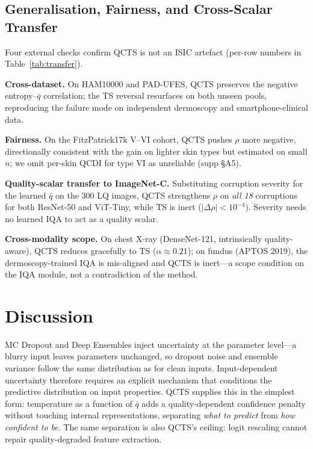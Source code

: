 \documentclass{bmvc2k}
\begin{document}


\subsection{Generalisation, Fairness, and Cross-Scalar Transfer}
\label{sec:generalisation}

Four external checks confirm QCTS is not an ISIC artefact (per-row numbers in Table~\ref{tab:transfer}).

\textbf{Cross-dataset.}
On HAM10000 and PAD-UFES, QCTS preserves the negative entropy--$\bar q$ correlation; the TS reversal resurfaces on both unseen pools, reproducing the failure mode on independent dermoscopy and smartphone-clinical data.

\textbf{Fairness.}
On the FitzPatrick17k V--VI cohort, QCTS pushes $\rho$ more negative, directionally consistent with the gain on lighter skin types but estimated on small $n$; we omit per-skin QCDI for type VI as unreliable (supp \S A5).

\textbf{Quality-scalar transfer to ImageNet-C.}
Substituting corruption severity for the learned $\bar q$ on the 300 LQ images, QCTS strengthens $\rho$ on \emph{all 18} corruptions for both ResNet-50 and ViT-Tiny, while TS is inert ($|\Delta\rho|{<}10^{-4}$). Severity needs no learned IQA to act as a quality scalar.

\textbf{Cross-modality scope.}
On chest X-ray (DenseNet-121, intrinsically quality-aware), QCTS reduces gracefully to TS ($\alpha{\approx}0.21$); on fundus (APTOS 2019), the dermoscopy-trained IQA is mis-aligned and QCTS is inert---a scope condition on the IQA module, not a contradiction of the method.



\section{Discussion}
\label{sec:discussion}

MC Dropout and Deep Ensembles inject uncertainty at the parameter level---a blurry input leaves parameters unchanged, so dropout noise and ensemble variance follow the same distribution as for clean inputs. Input-dependent uncertainty therefore requires an explicit mechanism that conditions the predictive distribution on input properties. QCTS supplies this in the simplest form: temperature as a function of $\bar q$ adds a quality-dependent confidence penalty without touching internal representations, separating \emph{what to predict} from \emph{how confident to be}. The same separation is also QCTS's ceiling: logit rescaling cannot repair quality-degraded feature extraction.
\end{document}

